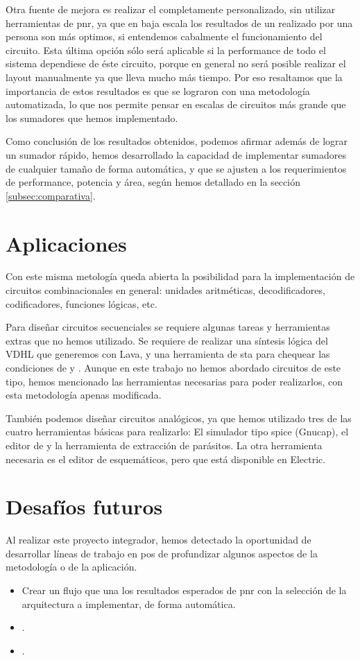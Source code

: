 Otra fuente de mejora es realizar el \layout completamente personalizado, sin utilizar herramientas de \gls{pnr}, ya que en baja escala los resultados de un \layout realizado por una persona son más optimos, si entendemos cabalmente el funcionamiento del circuito. Esta última opción sólo será aplicable si la performance de todo el sistema dependiese de éste circuito, porque en general no será posible realizar el layout manualmente ya que lleva mucho más tiempo. Por eso resaltamos que la importancia de estos resultados es que se lograron con una metodología automatizada, lo que nos permite pensar en escalas de circuitos más grande que los sumadores que hemos implementado.

Como conclusión de los resultados obtenidos, podemos afirmar además de lograr un sumador rápido, hemos desarrollado la capacidad de implementar sumadores de cualquier tamaño de forma automática, y que se ajusten a los requerimientos de performance, potencia y área,  según hemos detallado en la sección \ref{subsec:comparativa}.


\section{Aplicaciones}

Con este misma metología queda abierta la posibilidad para la implementación de circuitos combinacionales en general: unidades aritméticas, decodificadores, codificadores, funciones lógicas, etc. 

Para diseñar circuitos secuenciales se requiere algunas tareas y herramientas extras que no hemos utilizado. Se requiere de realizar una síntesis lógica del VDHL que generemos con Lava, y una herramienta de \gls{sta} para chequear las condiciones de  y . Aunque en este trabajo no hemos abordado circuitos de este tipo, hemos mencionado las herramientas necesarias para poder realizarlos, con esta metodología apenas modificada.

También podemos diseñar circuitos analógicos, ya que hemos utilizado tres de las cuatro herramientas básicas para realizarlo: El simulador tipo spice (Gnucap), el editor de \layout y la herramienta de extracción de parásitos. La otra herramienta necesaria es el editor de esquemáticos, pero que está disponible en Electric.

\section{Desafíos futuros}
Al realizar este proyecto integrador, hemos detectado la oportunidad de desarrollar líneas de trabajo en pos de profundizar algunos aspectos de la metodología o de la aplicación.  
\begin{itemize}
\item Crear un flujo que una los resultados esperados de \gls{pnr} con la selección de la arquitectura a implementar, de forma automática.
\item .
\item .
\end{itemize}






